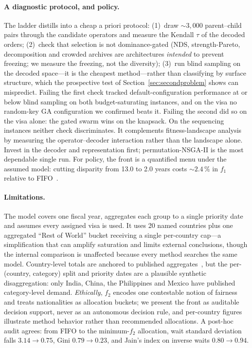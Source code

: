 \documentclass[runningheads]{llncs}
\begin{document}
\paragraph{A diagnostic protocol, and policy.}
The ladder distills into a cheap a priori protocol: (1)~draw ${\sim}3{,}000$ parent--child pairs through the candidate operators and measure the Kendall $\tau$ of the decoded orders; (2)~check that selection is not dominance-gated (NDS, strength-Pareto, decomposition and crowded archives are architectures \emph{intended} to prevent freezing; we measure the freezing, not the diversity); (3)~run blind sampling on the decoded space---it is the cheapest method---rather than classifying by surface structure, which the prospective test of Section~\ref{sec:secondproblem} shows can mispredict. Failing the first check tracked default-configuration performance at or below blind sampling on both budget-saturating instances, and on the visa no random-key GA configuration we confirmed beats it. Failing the second did so on the visa alone: the gated swarm wins on the knapsack. On the sequencing instances neither check discriminates. It complements fitness-landscape analysis~\cite{malan} by measuring the operator--decoder interaction rather than the landscape alone. Invest in the decoder and representation first; permutation-NSGA-II is the most dependable single run. For policy, the front is a quantified menu under the assumed model: cutting disparity from 13.0 to 2.0 years costs ${\sim}2.4\,\%$ in $f_1$ relative to FIFO~\cite{crs,fwd}.

\paragraph{Limitations.}
The model covers one fiscal year, aggregates each group to a single priority date and assumes every assigned visa is used. It uses 20 named countries plus one aggregated ``Rest of World'' bucket receiving a single per-country cap---a simplification that can amplify saturation and limits external conclusions, though the internal comparison is unaffected because every method searches the same model. Country-level totals are anchored to published aggregates~\cite{cato,uscis,dos}, but the per-(country, category) split and priority dates are a plausible synthetic disaggregation: only India, China, the Philippines and Mexico have published category-level demand. \emph{Ethically}, $f_2$ encodes one contestable notion of fairness and treats nationalities as allocation buckets; we present the front as auditable decision support, never as an autonomous decision rule, and per-country figures illustrate method behavior rather than recommended allocations. A post-hoc audit agrees: from FIFO to the minimum-$f_2$ allocation, wait standard deviation falls $3.14\to0.75$, Gini $0.79\to0.23$, and Jain's index on inverse waits $0.80\to0.94$.
\end{document}
